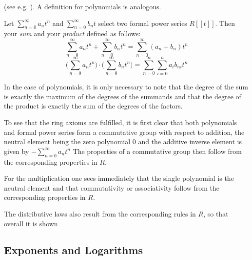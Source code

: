 (see e.g. \cite{LK}). A definition for polynomials is analogous.
\begin{definition} Let $ \sum _{n = 0} ^{\infty}{a} _{n}{t} ^{n} $ and
$ \sum _{n = 0} ^{\infty}{b} _{n}{t} $ select two formal power series
$ R [[t]] $. Then your \textit{sum} and your \textit{product}
defined as follows:
\begin{equation}
\sum _{n = 0} ^{\infty}{a} _{n}{t} ^{n} + \sum _{n = 0} ^{\infty}{b} _{n}{t } ^{n} = \sum _{n = 0} ^{\infty}{({a} _{n} +{b} _{n})}{t} ^{n}
\end{equation}
\begin{equation}
\bigg (\sum _{n = 0} ^{\infty}{a} _{n}{t} ^{n} \bigg) \cdot \bigg (\sum _{n = 0} ^{\infty }{b} _{n}{t} ^{n} \bigg) = \sum _{n = 0} ^{\infty} \sum _{i = 0} ^{n}{a} _{i }{{b} _{ni}}{t} ^{n}
\end{equation}
\end{definition}
In the case of polynomials, it is only necessary to note that the degree of the sum is exactly the maximum of the degrees of the summands and that the degree of the product is exactly the sum of the degrees of the factors.

To see that the ring axioms are fulfilled, it is first clear that both polynomials and formal power series form a commutative group with respect to addition, the neutral element being the zero polynomial $ 0 $ and the additive inverse element is given by $ - \sum_{n = 0} ^ \infty a_n t ^ n $ The properties of a commutative group then follow from the corresponding properties in $ R $.

For the multiplication one sees immediately that the single polynomial is the neutral element and that commutativity or associativity follow from the corresponding properties in $ R $.

The distributive laws also result from the corresponding rules in $ R $, so that overall it is shown






\subsection{Exponents and Logarithms}





